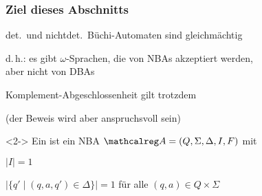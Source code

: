 
    \begin{frame}
      \frametitle{Ziel dieses Abschnitts}
      
      \begin{Itemize}
        \item
          det.\ und nichtdet.\ Büchi-Automaten sind
           gleichmächtig
          \begin{Itemize}
            \item[]
              d.\,h.: es gibt $\omega$-Sprachen, die von NBAs akzeptiert werden,\\
              aber nicht von DBAs              
          \end{Itemize}
        \item
          Komplement-Abgeschlossenheit gilt trotzdem
          \begin{Itemize}
            \item[]
              (der Beweis wird aber anspruchsvoll sein)
          \end{Itemize}
      \end{Itemize}

      \par\bigskip
      \begin{Definition}<2->
        Ein  ist ein NBA $\Aut{A} = (Q,\Sigma,\Delta,I,F)$ mit
        \begin{Itemize}
          \item
            $|I|=1$
          \item
            $|\{q' \mid (q,a,q') \in \Delta\}| = 1$ für alle $(q,a) \in Q \times \Sigma$
        \end{Itemize}
      \end{Definition}


\end{frame}
